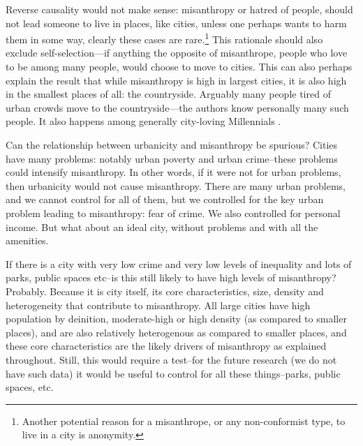 \documentclass[10pt, letterpaper]{article}
\begin{document}
\begin{spacing}{1.4}
Reverse causality would not make sense: misanthropy or hatred of people, should not lead someone to live in places, like cities, unless one perhaps wants to harm them in some way, clearly these cases are rare.\footnote{Another potential reason for a misanthrope, or any non-conformist type, to live in a city is anonymity.} This rationale should also exclude self-selection---if anything the opposite of misanthrope, people who love to be among many people, would choose to move to cities. This can also perhaps explain the result that while misanthropy is high in largest
cities, it is also high in the smallest places of all: the
countryside. {Arguably many people tired of urban crowds move to the
  countryside---the authors know personally many such people. It also happens among generally city-loving Millennials  \citep[e.g.,][]{deweyWP17nov23}.}

Can the relationship between urbanicity and misanthropy be spurious? Cities have
many problems: notably urban poverty and urban crime--these problems could
intensify misanthropy. In other words, if it were not for urban problems, then
urbanicity would not cause misanthropy. There are many urban problems, and we
cannot control for all of them, but we controlled for the key urban problem
leading to misanthropy: fear of crime. We also controlled for personal
income. But what about an ideal city, without problems and with all the amenities.

If there is a city with very low crime and very low levels of inequality and
lots of parks, public spaces etc--is this still likely to have high levels of
misanthropy? Probably. Because it is city itself, its core characteristics, size,
density and heterogeneity that contribute to misanthropy. All large cities have high population by deinition, moderate-high or
high density (as compared to smaller places), and are also relatively heterogenous as compared to smaller places, and these core
characteristics are the likely drivers of misanthropy as explained throughout. 
%
Still, this  would require a test--for the future research (we do not have such data) it would be useful to
control for all these things--parks, public spaces, etc.%


\end{spacing}
\end{document}
